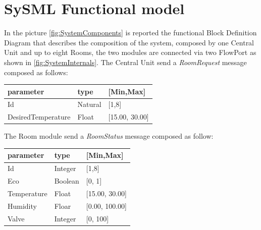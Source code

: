 \section{SySML Functional model}
In the picture \ref{fig:SystemComponents} is reported the functional Block Definition Diagram that describes the composition of the system, composed by one Central Unit and up to eight Rooms, the two modules are connected via two FlowPort as shown in \ref{fig:SystemInternals}.
The Central Unit send a \textit{RoomRequest} message composed as follows:
\begin{center}
	\begin{tabular}{||l | l| l ||} 
		\hline
		\textbf{parameter} 	& \textbf{type} & \textbf{[Min,Max]}\\ 
		\hline
		Id 					&  Natural & [1,8] \\ 
		\hline
		DesiredTemperature 	&  Float & [15.00, 30.00] \\ 
		\hline
	\end{tabular}
\end{center}
The Room module send a \textit{RoomStatus} message composed as follow:
\begin{center}
	\begin{tabular}{||l | l| l ||} 
		\hline
		\textbf{parameter} 	& \textbf{type} & \textbf{[Min,Max]}\\ 
		\hline
		Id 					&  Integer & [1,8] \\ 
		\hline
		Eco				 	&  Boolean & [0, 1] \\ 
		\hline
		Temperature			&  Float & [15.00, 30.00] \\ 
		\hline
		Humidity			&  Floar & [0.00, 100.00] \\ 
		\hline
		Valve				&  Integer & [0, 100] \\ 
		\hline
	\end{tabular}
\end{center}

